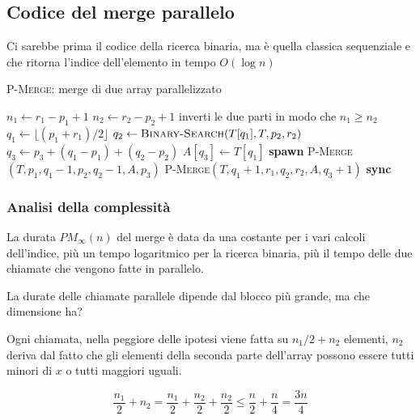 \subsection{Codice del merge parallelo}\label{codice-del-merge-parallelo}

Ci sarebbe prima il codice della ricerca binaria, ma è quella classica
sequenziale e che ritorna l'indice dell'elemento in tempo $O(\log n)$

\begin{breakablealgorithm}
	\caption{\textsc{P-Merge}: merge di due array parallelizzato}
	\begin{algorithmic}[1]
    \State $n_1 \gets r_1 - p_1 +1$
    \State $n_2 \gets r_2 - p_2 +1$
        \State inverti le due parti in modo che $n_1 \geq n_2$
    \EndIf
        \State \Return
    \EndIf
    \State $q_1 \gets \lfloor (p_1 + r_1) / 2 \rfloor$ 
    \State $q_2 \gets \textsc{Binary-Search}(T[q_1], T, p_2, r_2)$
    \State $q_3 \gets p_3 + (q_1 - p_1) + (q_2 - p_2)$ 
    \State $A[q_3] \gets T[q_1]$
    \State \textbf{spawn } \textsc{P-Merge}$(T, p_1, q_1 -1, p_2, q_2 -1, A, p_3)$ 
    \State \textsc{P-Merge}$(T, q_1 +1, r_1, q_2, r_2, A, q_3+1)$
    \State \textbf{sync}
\EndFunction
\end{algorithmic}
\end{breakablealgorithm}

\subsubsection{Analisi della complessità}\label{analisi-della-complessituxe0}

La durata $PM_\infty(n)$ del merge è data da una costante per i vari calcoli dell'indice, più un tempo logaritmico per la ricerca binaria, più il tempo delle due chiamate che vengono fatte in parallelo.

La durate delle chiamate parallele dipende dal blocco più grande, ma che dimensione ha?

Ogni chiamata, nella peggiore delle ipotesi viene fatta su $n_1/2 + n_2$ elementi, $n_2$ deriva dal fatto che gli elementi della seconda parte dell'array possono essere tutti minori di $x$ o tutti maggiori uguali.

$$\frac{n_1}{2} +n_2 = \frac{n_1}{2} + \frac{n_2}{2} + \frac{n_2}{2} \leq \frac{n}{2} + \frac{n}{4} = \frac{3n}{4}$$

